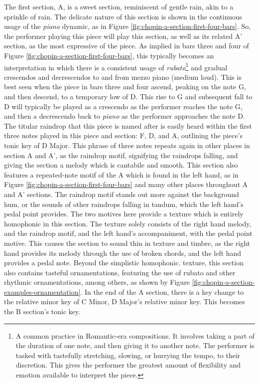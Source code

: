 The first section, A, is a sweet section, reminiscent of gentle rain, akin to a sprinkle of rain. The delicate nature of this section is shown in the continuous usage of the \textit{piano} dynamic, as in Figure \ref{fig:chopin-a-section-first-four-bars}\autocite{Hansen_1973}. So, the performer playing this piece will play this section, as well as its related A' section, as the most expressive of the piece. As implied in bars three and four of Figure \ref{fig:chopin-a-section-first-four-bars}\autocite{Hansen_1973}, this typically becomes an interpretation in which there is a consistent usage of \textit{rubato}\autocite{Cole_Schwartz}\footnote{A common practice in Romantic-era compositions. It involves taking a part of the duration of one note, and then giving it to another note. The performer is tasked with tastefully stretching, slowing, or hurrying the tempo, to their discretion. This gives the performer the greatest amount of flexibility and emotion available to interpret the piece.} and gradual crescendos and decrescendos to and from mezzo piano (medium loud). This is best seen when the piece in bars three and four ascend, peaking on the note G, and then descend, to a temporary low of D. This rise to G and subsequent fall to D will typically be played as a crescendo as the performer reaches the note G, and then a decrescendo back to \textit{piano} as the performer approaches the note D. The titular raindrop that this piece is named after is easily heard within the first three notes played in this piece and section: F, D\musFlat{}, and A\musFlat{}, outlining the piece's tonic key of D\musFlat{} Major. This phrase of three notes repeats again in other places in section A and A', as the raindrop motif, signifying the raindrops falling, and giving the section a melody which is cantabile and smooth. This section also features a repeated-note motif of the A\musFlat{} which is found in the left hand, as in Figure \ref{fig:chopin-a-section-first-four-bars}\autocite{Hansen_1973} and many other places throughout A and A' sections. The raindrop motif stands out more against the background hum, or the sounds of other raindrops falling in tandum, which the left hand's pedal point provides. The two motives here provide a texture which is entirely homophonic in this section. The texture solely consists of the right hand melody, and the raindrop motif, and the left hand's accompaniment, with the pedal point motive. This causes the section to sound thin in texture and timbre, as the right hand provides its melody through the use of broken chords, and the left hand provides a pedal note. Beyond the simplistic homophonic. texture, this section also contains tasteful ornamentations, featuring the use of rubato and other rhythmic ornamentations, among others, as shown by Figure \ref{fig:chopin-a-section-examples-ornamentation}. In the end of the A section, there is a key change to the relative minor key of C\musSharp{} Minor, D\musFlat{} Major's relative minor key. This becomes the B section's tonic key.

